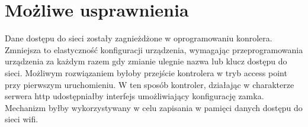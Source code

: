 \section{Możliwe usprawnienia}
Dane dostępu do sieci zostały zagnieżdżone w oprogramowaniu konrolera. Zmniejsza to elastyczność konfiguracji urządzenia, wymagając przeprogramowania urządzenia za każdym razem gdy zmianie ulegnie nazwa lub klucz dostępu do sieci. Możliwym rozwiązaniem byłoby przejście kontrolera w tryb access point przy pierwszym uruchomieniu. W ten sposób kontroler, działając w charakterze serwera http udostępniałby interfejs umożliwiający konfigurację zamka. Mechanizm byłby wykorzystywany w celu zapisania w pamięci danych dostępu do sieci wifi.
